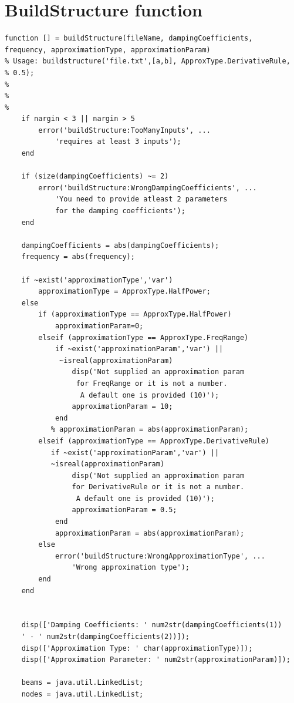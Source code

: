 \documentclass[10pt,a4paper,final]{report}
\begin{document}
\section{BuildStructure function}
\begin{lstlisting}
function [] = buildStructure(fileName, dampingCoefficients, 
frequency, approximationType, approximationParam)
% Usage: buildstructure('file.txt',[a,b], ApproxType.DerivativeRule,
% 0.5);
%
%
%
    if nargin < 3 || nargin > 5
        error('buildStructure:TooManyInputs', ...
            'requires at least 3 inputs');
    end
    
    if (size(dampingCoefficients) ~= 2)
        error('buildStructure:WrongDampingCoefficients', ...
            'You need to provide atleast 2 parameters 
            for the damping coefficients');
    end
    
    dampingCoefficients = abs(dampingCoefficients);
    frequency = abs(frequency);
    
    if ~exist('approximationType','var')
        approximationType = ApproxType.HalfPower;
    else
        if (approximationType == ApproxType.HalfPower)
            approximationParam=0;
        elseif (approximationType == ApproxType.FreqRange)
            if ~exist('approximationParam','var') ||
             ~isreal(approximationParam)
                disp('Not supplied an approximation param
                 for FreqRange or it is not a number.
                  A default one is provided (10)');
                approximationParam = 10;
            end
           % approximationParam = abs(approximationParam);
        elseif (approximationType == ApproxType.DerivativeRule)
           if ~exist('approximationParam','var') || 
           ~isreal(approximationParam)
                disp('Not supplied an approximation param 
                for DerivativeRule or it is not a number.
                 A default one is provided (10)');
                approximationParam = 0.5;
            end
            approximationParam = abs(approximationParam);
        else
            error('buildStructure:WrongApproximationType', ...
                'Wrong approximation type');
        end
    end

    
    disp(['Damping Coefficients: ' num2str(dampingCoefficients(1)) 
    ' - ' num2str(dampingCoefficients(2))]);
    disp(['Approximation Type: ' char(approximationType)]);
    disp(['Approximation Parameter: ' num2str(approximationParam)]);

    beams = java.util.LinkedList;
    nodes = java.util.LinkedList;
   

\end{lstlisting}
\end{document}
